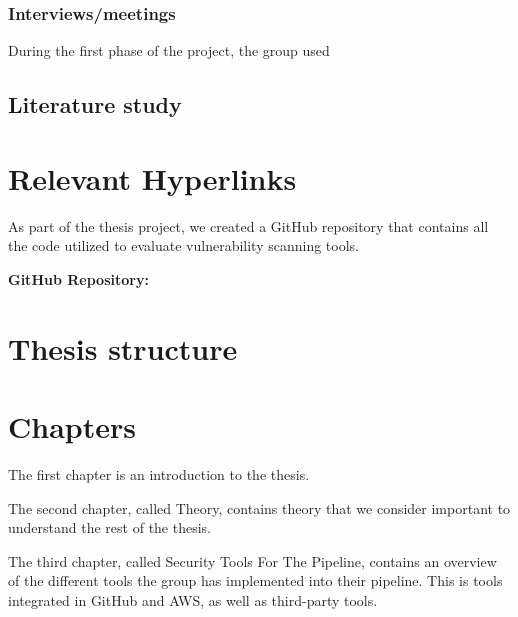 \subsubsection{Interviews/meetings}
During the first phase of the project, the group used 
\subsection{Literature study}

\section{Relevant Hyperlinks}
As part of the thesis project, we created a GitHub repository that contains all the code utilized to evaluate vulnerability scanning tools.

\textbf{GitHub Repository:} \href{}{}


\section{Thesis structure}
\section{Chapters}
The first chapter is an introduction to the thesis.

The second chapter, called Theory, contains theory that we consider important to understand the rest of the thesis.

The third chapter, called Security Tools For The Pipeline, contains an overview of the different tools the group has implemented into their pipeline. This is tools integrated in GitHub and AWS, as well as third-party tools. 




